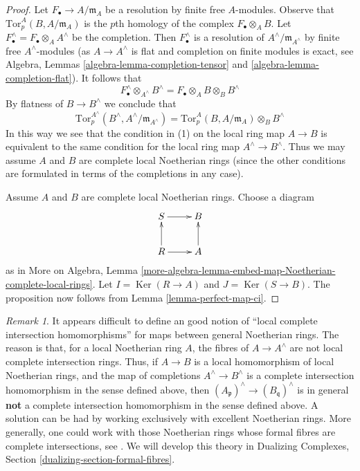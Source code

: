 \documentclass{stacks-project}
\theoremstyle{plain}
\theoremstyle{definition}
\theoremstyle{remark}
\newtheorem{remark}[subsection]{Remark}
\numberwithin{equation}{subsection}
\def\Ker{\mathop{\mathrm{Ker}}}
\begin{document}
\begin{proof}
Let $F_\bullet \to A/\mathfrak m_A$ be a resolution by finite
free $A$-modules. Observe that
$\text{Tor}^A_p(B, A/\mathfrak m_A)$
is the $p$th homology of the complex $F_\bullet \otimes_A B$.
Let $F_\bullet^\wedge = F_\bullet \otimes_A A^\wedge$ be the completion.
Then $F_\bullet^\wedge$ is a resolution of $A^\wedge/\mathfrak m_{A^\wedge}$
by finite free $A^\wedge$-modules (as $A \to A^\wedge$ is flat and completion
on finite modules is exact, see
Algebra, Lemmas \ref{algebra-lemma-completion-tensor} and
\ref{algebra-lemma-completion-flat}).
It follows that
$$
F_\bullet^\wedge \otimes_{A^\wedge} B^\wedge =
F_\bullet \otimes_A B \otimes_B B^\wedge
$$
By flatness of $B \to B^\wedge$ we conclude that
$$
\text{Tor}^{A^\wedge}_p(B^\wedge, A^\wedge/\mathfrak m_{A^\wedge}) =
\text{Tor}^A_p(B, A/\mathfrak m_A) \otimes_B B^\wedge
$$
In this way we see that the condition in (1) on the local ring map $A \to B$
is equivalent to the same condition for the local ring map
$A^\wedge \to B^\wedge$.
Thus we may assume $A$ and $B$ are complete local Noetherian rings
(since the other conditions are formulated in terms of the completions
in any case).

\medskip\noindent
Assume $A$ and $B$ are complete local Noetherian rings.
Choose a diagram
$$
\xymatrix{
S \ar[r] & B \\
R \ar[u] \ar[r] & A \ar[u]
}
$$
as in More on Algebra, Lemma
\ref{more-algebra-lemma-embed-map-Noetherian-complete-local-rings}.
Let $I = \Ker(R \to A)$ and $J = \Ker(S \to B)$.
The proposition now follows from Lemma \ref{lemma-perfect-map-ci}.
\end{proof}

\begin{remark}
\label{remark-no-good-ci-map}
It appears difficult to define an good notion of ``local complete
intersection homomorphisms'' for maps between general Noetherian rings.
The reason is that, for a local Noetherian ring $A$, the fibres of
$A \to A^\wedge$ are not local complete intersection rings.
Thus, if $A \to B$ is a local homomorphism of local Noetherian rings,
and the map of completions $A^\wedge \to B^\wedge$ is a
complete intersection homomorphism in the sense defined above,
then $(A_\mathfrak p)^\wedge \to (B_\mathfrak q)^\wedge$ is in general
{\bf not} a complete intersection homomorphism in the sense
defined above. A solution can be had by working exclusively with
excellent Noetherian rings. More generally, one could work with
those Noetherian rings whose formal fibres are complete
intersections, see \cite{Rodicio-ci}.
We will develop this theory in
Dualizing Complexes, Section \ref{dualizing-section-formal-fibres}.
\end{remark}
\end{document}
